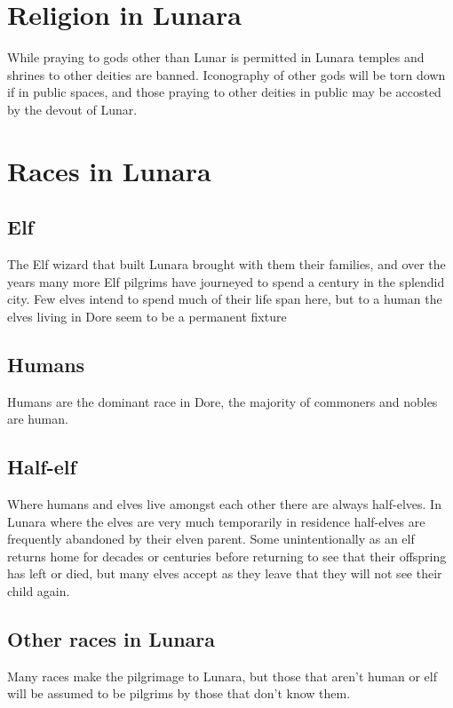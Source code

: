 \documentclass[10pt,twoside,twocolumn,openany,justified,bg=full,nomultitoc]{dndbook}
\begin{document}
\section{Religion in Lunara}
\label{sec-5-1}
While praying to gods other than Lunar is permitted in Lunara temples and shrines to other deities are banned. Iconography of other gods will be torn down if in public spaces, and those praying to other deities in public may be accosted by the devout of Lunar.

\section{Races in Lunara}
\label{sec-5-2}
\subsection{Elf}
\label{sec-5-2-1}
The Elf wizard that built Lunara brought with them their families, and over the years many more Elf pilgrims have journeyed to spend a century in the splendid city. Few elves intend to spend much of their life span here, but to a human the elves living in Dore seem to be a permanent fixture
\subsection{Humans}
\label{sec-5-2-2}
Humans are the dominant race in Dore, the majority of commoners and nobles are human.
\subsection{Half-elf}
\label{sec-5-2-3}
Where humans and elves live amongst each other there are always half-elves. In Lunara where the elves are very much temporarily in residence half-elves are frequently abandoned by their elven parent. Some unintentionally as an elf returns home for decades or centuries before returning to see that their offspring has left or died, but many elves accept as they leave that they will not see their child again.
\subsection{Other races in Lunara}
\label{sec-5-2-4}
Many races make the pilgrimage to Lunara, but those that aren't human or elf will be assumed to be pilgrims by those that don't know them.
\end{document}
